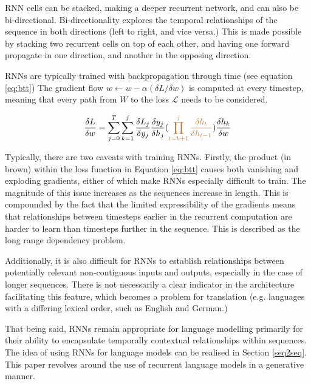 \documentclass[12pt,twoside]{report}
\begin{document}
RNN cells can be stacked, making a deeper recurrent network, and can also be bi-directional. Bi-directionality explores the temporal relationships of the sequence in both directions (left to right, and vice versa.) This is made possible by stacking two recurrent cells on top of each other, and having one forward propagate in one direction, and another in the opposing direction.

RNNs are typically trained with backpropagation through time (see equation \ref{eq:btt}) The gradient flow $w \leftarrow w - \alpha ({\delta L}/{\delta w})$ is computed at every timestep, meaning that every path from $W$ to the loss $\mathcal{L}$ needs to be considered.

\begin{equation}
\label{eq:btt}
\begin{aligned}
	\frac{\delta L}{\delta w} = \sum^T_{j=0}\sum^j_{k=1}\frac{\delta L_j}{\delta y_j}\frac{\delta y_j}{\delta h_j}(\begingroup\color{brown}\prod^j_{t=k+1}\frac{\delta h_t}{\delta h_{t-1}}\endgroup)\frac{\delta h_k}{\delta w}
\end{aligned}
\end{equation}

Typically, there are two caveats with training RNNs. Firstly, the product (in brown) within the loss function in Equation \ref{eq:btt} causes both vanishing and exploding gradients, either of which make RNNs especially difficult to train. The magnitude of this issue increases as the sequences increase in length. This is compounded by the fact that the limited expressibility of the gradients means that relationships between timesteps earlier in the recurrent computation are harder to learn than timesteps further in the sequence. This is described as the long range dependency problem.

Additionally, it is also difficult for RNNs to establish relationships between potentially relevant non-contiguous inputs and outputs, especially in the case of longer sequences. There is not necessarily a clear indicator in the architecture facilitating this feature, which becomes a problem for translation (e.g. languages with a differing lexical order, such as English and German.)

That being said, RNNs remain appropriate for language modelling primarily for their ability to encapsulate temporally contextual relationships within sequences. The idea of using RNNs for language models can be realised in Section \ref{seq2seq}. This paper revolves around the use of recurrent language models in a generative manner.
\end{document}
